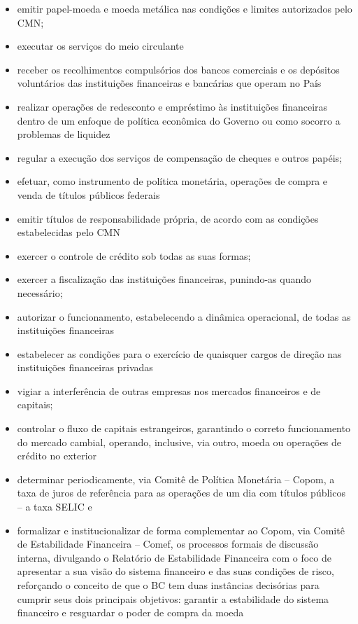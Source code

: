 \documentclass[]{article}
\providecommand{\tightlist}{%
  \setlength{\itemsep}{0pt}\setlength{\parskip}{0pt}}
\begin{document}
\begin{itemize}
\tightlist
\item
  emitir papel-moeda e moeda metálica nas condições e limites
  autorizados pelo CMN;
\item
  executar os serviços do meio circulante
\item
  receber os recolhimentos compulsórios dos bancos comerciais e os
  depósitos voluntários das instituições financeiras e bancárias que
  operam no País
\item
  realizar operações de redesconto e empréstimo às instituições
  financeiras dentro de um enfoque de política econômica do Governo ou
  como socorro a problemas de liquidez
\item
  regular a execução dos serviços de compensação de cheques e outros
  papéis;
\item
  efetuar, como instrumento de política monetária, operações de compra e
  venda de títulos públicos federais
\item
  emitir títulos de responsabilidade própria, de acordo com as condições
  estabelecidas pelo CMN
\item
  exercer o controle de crédito sob todas as suas formas;
\item
  exercer a fiscalização das instituições financeiras, punindo-as quando
  necessário;
\item
  autorizar o funcionamento, estabelecendo a dinâmica operacional, de
  todas as instituições financeiras
\item
  estabelecer as condições para o exercício de quaisquer cargos de
  direção nas instituições financeiras privadas
\item
  vigiar a interferência de outras empresas nos mercados financeiros e
  de capitais;
\item
  controlar o fluxo de capitais estrangeiros, garantindo o correto
  funcionamento do mercado cambial, operando, inclusive, via outro,
  moeda ou operações de crédito no exterior
\item
  determinar periodicamente, via Comitê de Política Monetária -- Copom,
  a taxa de juros de referência para as operações de um dia com títulos
  públicos -- a taxa SELIC e
\item
  formalizar e institucionalizar de forma complementar ao Copom, via
  Comitê de Estabilidade Financeira -- Comef, os processos formais de
  discussão interna, divulgando o Relatório de Estabilidade Financeira
  com o foco de apresentar a sua visão do sistema financeiro e das suas
  condições de risco, reforçando o conceito de que o BC tem duas
  instâncias decisórias para cumprir seus dois principais objetivos:
  garantir a estabilidade do sistema financeiro e resguardar o poder de
  compra da moeda
\end{itemize}
\end{document}
